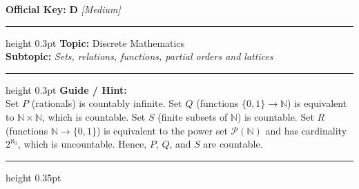 \documentclass[a4paper,10pt]{article}
\begin{document}
\begin{tcolorbox}
\textbf{Official Key:} \textbf{\large D} \hfill \textit{\small [Medium]}
\vspace{2pt}\hrule height 0.3pt\vspace{3pt}
\textbf{Topic:} Discrete Mathematics \\
\textbf{Subtopic:} \textit{Sets, relations, functions, partial orders and lattices}
\vspace{2pt}\hrule height 0.3pt\vspace{3pt}
\textbf{Guide / Hint:} \\
{\small Set $P$ (rationals) is countably infinite. Set $Q$ (functions $\{0, 1\} \to \mathbb{N}$) is equivalent to $\mathbb{N} \times \mathbb{N}$, which is countable. Set $S$ (finite subsets of $\mathbb{N}$) is countable. Set $R$ (functions $\mathbb{N} \to \{0, 1\}$) is equivalent to the power set $\mathcal{P}(\mathbb{N})$ and has cardinality $2^{\aleph_0}$, which is uncountable. Hence, $P$, $Q$, and $S$ are countable.}

\end{tcolorbox}
\vspace{6pt}\hrule height 0.35pt\vspace{6pt}
\noindent
\end{document}
